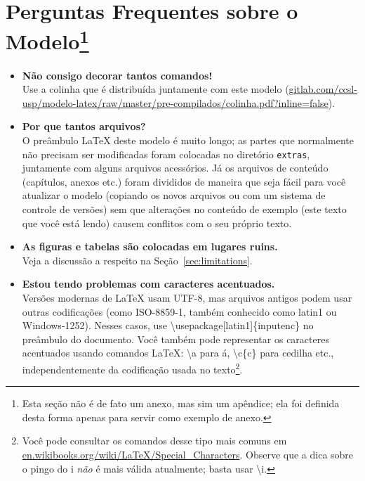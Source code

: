
\chapter[Perguntas Frequentes sobre o Modelo]{Perguntas Frequentes sobre o Modelo\footnote{Esta
seção não é de fato um anexo, mas sim um apêndice; ela foi definida desta
forma apenas para servir como exemplo de anexo.}}

\begin{itemize}

\item \textbf{Não consigo decorar tantos comandos!}\\
Use a colinha que é distribuída juntamente com este modelo (\url{gitlab.com/ccsl-usp/modelo-latex/raw/master/pre-compilados/colinha.pdf?inline=false}).

\item \textbf{Por que tantos arquivos?}\\
O preâmbulo \LaTeX{} deste modelo é muito longo; as partes que normalmente não precisam ser modificadas foram colocadas no diretório \texttt{extras}, juntamente com alguns arquivos acessórios. Já os arquivos de conteúdo (capítulos, anexos etc.) foram divididos de maneira que seja fácil para você atualizar o modelo (copiando os novos arquivos ou com um sistema de controle de versões) sem que alterações no conteúdo de exemplo (este texto que você está lendo) causem conflitos com o seu próprio texto.

\item \textbf{As figuras e tabelas são colocadas em lugares ruins.}\\
Veja a discussão a respeito na Seção~\ref{sec:limitations}.

\item \textbf{Estou tendo problemas com caracteres acentuados.}\\
Versões modernas de \LaTeX{} usam UTF-8, mas arquivos antigos podem usar outras codificações (como ISO-8859-1, também conhecido como latin1 ou Windows-1252). Nesses casos, use \textsf{\textbackslash{}usepackage[latin1]\{inputenc\}} no preâmbulo do documento. Você também pode representar os caracteres acentuados usando comandos \LaTeX{}: \textsf{\textbackslash\textquotesingle{}a} para á, \textsf{\textbackslash{}c\{c\}} para cedilha etc., independentemente da codificação usada no texto\footnote{Você pode consultar os comandos desse tipo mais comuns em \url{en.wikibooks.org/wiki/LaTeX/Special_Characters}. Observe que a dica sobre o pingo do i \emph{não} é mais válida atualmente; basta usar \textsf{\textbackslash\textquotesingle{}i}.}.


\end{itemize}
